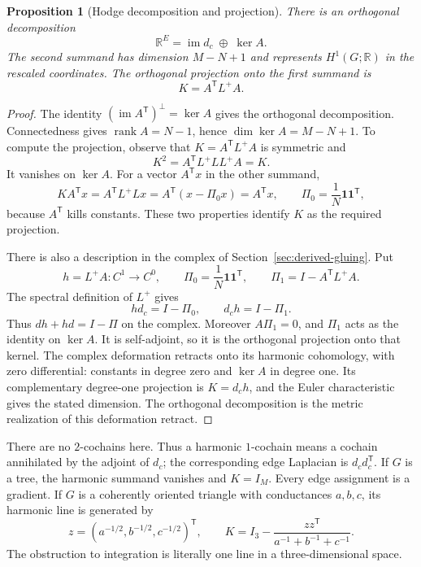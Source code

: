 \documentclass[11pt]{article}
\newtheorem{proposition}[theorem]{Proposition}
\theoremstyle{definition}
\theoremstyle{remark}
\newcommand{\R}{\mathbb R}
\begin{document}
\begin{proposition}[Hodge decomposition and projection]\label{prop:glin-hodge}
There is an orthogonal decomposition
\[
 \R^E=\operatorname{im}d_c\;\mathbin\oplus\;\ker A.
\]
The second summand has dimension $M-N+1$ and represents $H^1(G;\R)$ in the rescaled coordinates. The orthogonal projection onto the first summand is
\begin{equation}\label{eq:glin-projection}
 K=A^{\mathsf T}L^+A.
\end{equation}
\end{proposition}
\begin{proof}
The identity $(\operatorname{im}A^{\mathsf T})^\perp=\ker A$ gives the orthogonal decomposition. Connectedness gives $\operatorname{rank}A=N-1$, hence $\dim\ker A=M-N+1$. To compute the projection, observe that $K=A^{\mathsf T}L^+A$ is symmetric and
\[
 K^2=A^{\mathsf T}L^+LL^+A=K.
\]
It vanishes on $\ker A$. For a vector $A^{\mathsf T}x$ in the other summand,
\[
 K A^{\mathsf T}x=A^{\mathsf T}L^+Lx
 =A^{\mathsf T}(x-\Pi_0x)=A^{\mathsf T}x,
 \qquad \Pi_0=\frac1N\mathbf1\mathbf1^{\mathsf T},
\]
because $A^{\mathsf T}$ kills constants. These two properties identify $K$ as the required projection.

There is also a description in the complex of Section~\ref{sec:derived-gluing}. Put
\[
 h=L^+A:C^1\longrightarrow C^0,
 \qquad \Pi_0=\frac1N\mathbf1\mathbf1^{\mathsf T},
 \qquad \Pi_1=I-A^{\mathsf T}L^+A.
\]
The spectral definition of $L^+$ gives
\[
 hd_c=I-\Pi_0,\qquad d_ch=I-\Pi_1.
\]
Thus $dh+hd=I-\Pi$ on the complex. Moreover $A\Pi_1=0$, and $\Pi_1$ acts as the identity on $\ker A$. It is self-adjoint, so it is the orthogonal projection onto that kernel. The complex deformation retracts onto its harmonic cohomology, with zero differential: constants in degree zero and $\ker A$ in degree one. Its complementary degree-one projection is $K=d_ch$, and the Euler characteristic gives the stated dimension. The orthogonal decomposition is the metric realization of this deformation retract.
\end{proof}

There are no $2$-cochains here. Thus a harmonic $1$-cochain means a cochain annihilated by the adjoint of $d_c$; the corresponding edge Laplacian is $d_cd_c^{\mathsf T}$. If $G$ is a tree, the harmonic summand vanishes and $K=I_M$. Every edge assignment is a gradient. If $G$ is a coherently oriented triangle with conductances $a,b,c$, its harmonic line is generated by
\[
 z=(a^{-1/2},b^{-1/2},c^{-1/2})^{\mathsf T},\qquad
 K=I_3-\frac{zz^{\mathsf T}}{a^{-1}+b^{-1}+c^{-1}}.
\]
The obstruction to integration is literally one line in a three-dimensional space.
\end{document}
